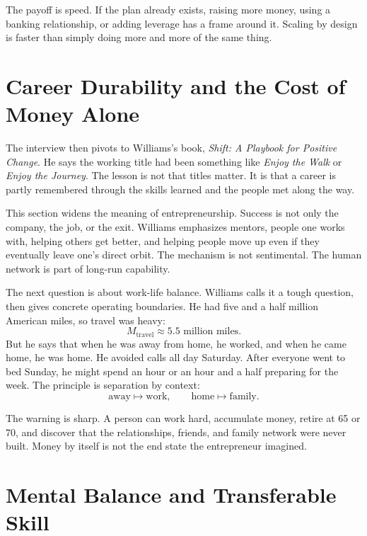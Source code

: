 The payoff is speed. If the plan already exists, raising more money, using a banking relationship, or adding leverage has a frame around it. Scaling by design is faster than simply doing more and more of the same thing.

\section{Career Durability and the Cost of Money Alone}

The interview then pivots to Williams's book, \emph{Shift: A Playbook for Positive Change}. He says the working title had been something like \emph{Enjoy the Walk} or \emph{Enjoy the Journey}. The lesson is not that titles matter. It is that a career is partly remembered through the skills learned and the people met along the way.

This section widens the meaning of entrepreneurship. Success is not only the company, the job, or the exit. Williams emphasizes mentors, people one works with, helping others get better, and helping people move up even if they eventually leave one's direct orbit. The mechanism is not sentimental. The human network is part of long-run capability.

The next question is about work-life balance. Williams calls it a tough question, then gives concrete operating boundaries. He had five and a half million American miles, so travel was heavy:
\begin{equation}
M_{\mathrm{travel}} \approx 5.5\text{ million miles}.
\end{equation}
But he says that when he was away from home, he worked, and when he came home, he was home. He avoided calls all day Saturday. After everyone went to bed Sunday, he might spend an hour or an hour and a half preparing for the week. The principle is separation by context:
\begin{equation}
\text{away} \mapsto \text{work},
\qquad
\text{home} \mapsto \text{family}.
\end{equation}

The warning is sharp. A person can work hard, accumulate money, retire at 65 or 70, and discover that the relationships, friends, and family network were never built. Money by itself is not the end state the entrepreneur imagined.

\section{Mental Balance and Transferable Skill}

